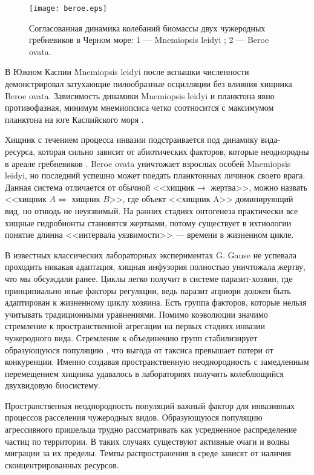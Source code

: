 \documentclass[a4paper,11pt,twoside]{article}
\begin{document}
\begin{figure}[h!] %
\centering
\texttt{[image: beroe.eps]}
\caption{Согласованная динамика колебаний биомассы двух чужеродных гребневиков в Черном море: 1 --- Mnemiopsis leidyi ; 2 --- Beroe ovata.}
\end{figure}

В Южном Каспии  Mnemiopsis leidyi после вспышки численности демонстрировал затухающие пилообразные осцилляции без влияния хищника Beroe ovata. Зависимость динамики  Mnemiopsis leidyi и планктона явно противофазная, минимум мнемиопсиса четко соотносится с максимумом планктона на юге Каспийского моря \cite{Variability}.

Хищник с течением процесса инвазии подстраивается под динамику вида-ресурса, которая сильно зависит от абиотических факторов, которые неоднородны в ареале гребневиков \cite{Hillis}. Beroe ovata уничтожает взрослых особей Mnemiopsis leidyi, но последний успешно может поедать планктонных личинок своего врага. Данная система отличается от обычной <<хищник$\rightarrow$ жертва>>, можно назвать <<хищник $A\Longleftrightarrow$ хищник $B$>>, где объект <<хищник A>> доминирующий вид, но отнюдь не неуязвимый. На ранних стадиях онтогенеза практически все хищные гидробионты становятся жертвами, потому существует в ихтиологии понятие длинна <<интервала уязвимости>> --- времени в жизненном цикле.

В известных классических лабораторных экспериментах G. Gause не успевала проходить никакая адаптация, хищная инфузория полностью уничтожала жертву, что мы обсуждали ранее.  Циклы легко получит в системе паразит-хозяин, где принципиально иные факторы регуляции, ведь паразит априори должен быть адаптирован к жизненному циклу хозяина. Есть группа факторов, которые нельзя учитывать традиционными уравнениями. Помимо коэволюции значимо стремление к пространственной агрегации на первых стадиях инвазии чужеродного вида. Стремление к объединению групп стабилизирует образующуюся популяцию \cite{Taksis}, что выгода от таксиса превышает потери от конкуренции. Именно создавая пространственную неоднородность с замедленным перемещением хищника удавалось в лабораториях получить колеблющийся двухвидовую биосистему.

Пространственная неоднородность популяций важный фактор для инвазивных процессов расселения чужеродных видов. Образующуюся популяцию агрессивного пришельца трудно рассматривать как усредненное распределение частиц по территории. В таких случаях существуют активные очаги и волны миграции за их пределы. Темпы распространения в среде зависят от наличия сконцентрированных ресурсов. 
\end{document}
